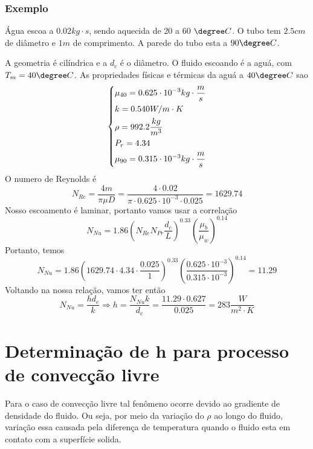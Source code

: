 \subsubsection{Exemplo}
Água escoa a \(0.02 kg \cdot s\), sendo aquecida de 20 a 60 \(\degree C\). O tubo tem \(2.5 cm\) de
diâmetro e \(1 m\) de comprimento. A parede do tubo esta a \(90\degree C\). \par

A geometria é cilíndrica e a \(d_c\) é o diâmetro. O fluido escoando é a aguá, com \(T_m = 40\degree
C\). As propriedades físicas e térmicas da aguá a \(40\degree C\) sao
\begin{align}
    \begin{dcases}
        \mu_{40} = 0.625 \cdot 10^{-3} kg \cdot \frac{m}{s}\\
        k = 0.540 W/m \cdot K\\
        \rho = 992.2 \frac{kg}{m^3}\\
        P_r = 4.34\\
        \mu_{90} = 0.315 \cdot 10^{-3} kg \cdot \frac{m}{s}
    \end{dcases}
\end{align}
O numero de Reynolds é
\begin{equation}
    N_{Re} = \frac{4m}{\pi \mu D} = \frac{4 \cdot 0.02}{\pi \cdot 0.625 \cdot 10^{-3} \cdot 0.025} = 1629.74
\end{equation}
Nosso escoamento é laminar, portanto vamos usar a correlação
\begin{equation}
    N_{Nu} = 1.86 \left(N_{Re} N_{Pr} \frac{d_c}{L} \right)^{0.33} \left(\frac{\mu_b}{\mu_w} \right)^{0.14}
\end{equation}
Portanto, temos
\begin{equation}
    N_{Nu} = 1.86 \left(1629.74 \cdot 4.34 \cdot \frac{0.025}{1} \right)^{0.33} \left(\frac{0.625 \cdot 10^{-3}}{0.315 \cdot 10^{-3}} \right)^{0.14} = 11.29
\end{equation}
Voltando na nossa relação, vamos ter então
\begin{equation}
    N_{Nu} = \frac{h d_c}{k} \Rightarrow h = \frac{N_{Nu} k}{d_c} = \frac{11.29 \cdot 0.627}{0.025} = 283 \frac{W}{m^2 \cdot K}
\end{equation}
\section{Determinação de h para processo de convecção livre}
Para o caso de convecção livre tal fenômeno ocorre devido ao gradiente de densidade do fluido. Ou
seja, por meio da variação do \(\rho \) ao longo do fluido, variação essa causada pela diferença de
temperatura quando o fluido esta em contato com a superfície solida. \par

